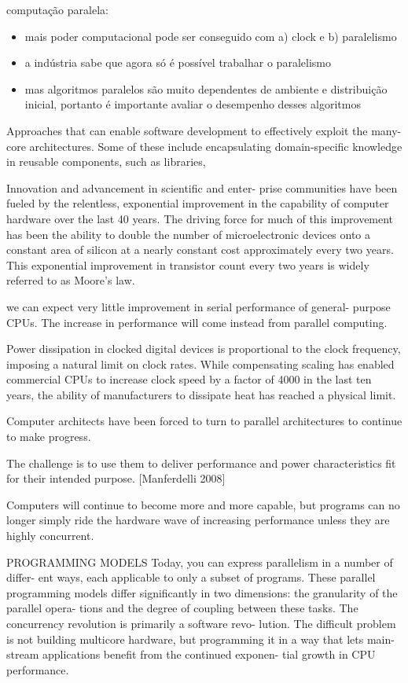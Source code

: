computação paralela:
\begin{itemize}
\item mais poder computacional pode ser conseguido com a) clock  e b) paralelismo
\item a indústria sabe que agora só é possível trabalhar o paralelismo
\item mas algoritmos paralelos são muito dependentes de ambiente e distribuição inicial, portanto é importante avaliar o desempenho desses algoritmos
\end{itemize}

Approaches that can enable software development to effectively exploit the many-core architectures. Some of these include encapsulating domain-specific knowledge in reusable components, such as libraries, 

Innovation and advancement in scientific and enter- prise communities have been fueled by the relentless, exponential improvement in the capability of computer hardware over the last 40 years. The driving force for much of this improvement has been the ability to double the number of microelectronic devices onto a constant area of silicon at a nearly constant cost approximately every two years. This exponential improvement in transistor count every two years is widely referred to as Moore’s law.

we can expect very little improvement in serial performance of general- purpose CPUs. The increase in performance will come instead from parallel computing. 

Power dissipation in clocked digital devices is proportional to the clock frequency, imposing a natural limit on clock rates. While compensating scaling has enabled commercial CPUs to increase clock speed by a factor of 4000 in the last ten years, the ability of manufacturers to dissipate heat has reached a physical limit. 

 Computer architects have been forced to turn to parallel architectures to continue to make progress.
 
 The challenge is to use them to deliver performance and power characteristics fit for their intended purpose.
 [Manferdelli 2008]
 
 
Computers will continue to become more and more capable, but programs can no longer simply ride the hardware wave of increasing performance unless they are highly concurrent. 
 
 PROGRAMMING MODELS
Today, you can express parallelism in a number of differ- ent ways, each applicable to only a subset of programs.
These parallel programming models differ significantly in two dimensions: the granularity of the parallel opera- tions and the degree of coupling between these tasks.
 The concurrency revolution is primarily a software revo- lution. The difficult problem is not building multicore hardware, but programming it in a way that lets main- stream applications benefit from the continued exponen- tial growth in CPU performance.
 
